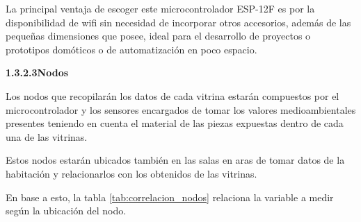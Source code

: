     La principal ventaja de escoger este microcontrolador ESP-12F es por la disponibilidad de wifi sin necesidad de incorporar otros accesorios, además de las pequeñas dimensiones que posee, ideal para el desarrollo de proyectos o prototipos domóticos o de automatización en poco espacio.\\

    \textbf{1.3.2.3\hspace{5mm}Nodos}

    Los nodos que recopilarán los datos de cada vitrina estarán compuestos por el microcontrolador y los sensores encargados de tomar los valores medioambientales presentes teniendo en cuenta el material de las piezas expuestas dentro de cada una de las vitrinas.
    
    Estos nodos estarán ubicados también en las salas en aras de tomar datos de la habitación y relacionarlos con los obtenidos de las vitrinas.

    En base a esto, la tabla \ref{tab:correlacion_nodos} relaciona la variable a medir según la ubicación del nodo.

